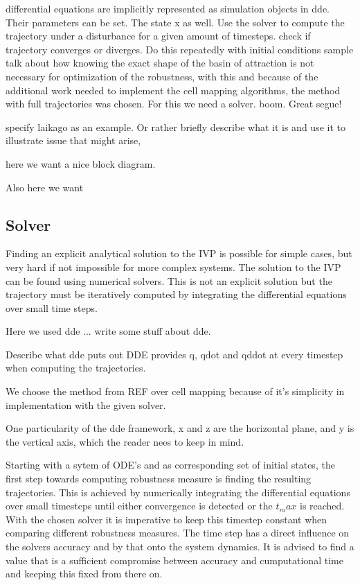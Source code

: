 differential equations are implicitly represented as simulation objects in dde. Their parameters can be set. The state x as well. Use the solver to compute the trajectory under a disturbance for a given amount of timesteps. check if trajectory converges or diverges. Do this repeatedly with initial conditions sample
talk about how knowing the exact shape of the basin of attraction is not necessary for optimization of the robustness, with this and because of the additional work needed to implement the cell mapping algorithms, the method with full trajectories was chosen. For this we need a solver. boom. Great segue!


specify laikago as an example. Or rather briefly describe what it is and use it to illustrate issue that might arise, 

here we want a nice block diagram. 

Also here we want

\subsection{Solver}

Finding an explicit analytical solution to the IVP is possible for simple cases, but very hard if not impossible for more complex systems. 
The solution to the IVP can be found using numerical solvers. This is not an explicit solution but the trajectory must be iteratively computed by integrating the differential equations over small time steps. 

Here we used dde ... write some stuff about dde.

Describe what dde puts out
    DDE provides q, qdot and qddot at every timestep when computing the trajectories. 

We choose the method from REF over cell mapping because of it's simplicity in implementation with the given solver. 

One particularity of the dde framework, x and z are the horizontal plane, and y is the vertical axis, which the reader nees to keep in mind. 

Starting with a sytem of ODE's and as corresponding set of initial states, the first step towards computing robustness measure is finding the resulting trajectories. This is achieved by numerically integrating the differential equations over small timesteps until either convergence is detected or the $t_max$ is reached. With the chosen solver it is imperative to keep this timestep constant when comparing different robustness measures. The time step has a direct influence on the solvers accuracy and by that onto the system dynamics. It is advised to find a value that is a sufficient compromise between accuracy and cumputational time and keeping this fixed from there on.

